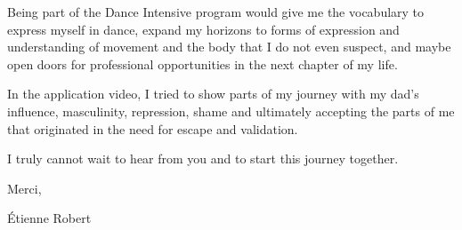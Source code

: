 \documentclass[12pt, a4paper]{article}
\begin{document}


%
%
%


Being part of the Dance Intensive program would
give me the vocabulary to express myself in dance,
expand my horizons to forms of expression and understanding of movement and
the body that I do not even suspect, and
maybe open doors for professional opportunities in the next chapter of my life.

In the application video, I tried to show parts of my journey with my dad's influence,
masculinity, repression, shame and ultimately
accepting the parts of me that originated in the need for escape and validation.

I truly cannot wait to hear from you and to start this journey together.

\bigskip


Merci,

Étienne Robert
\end{document}
